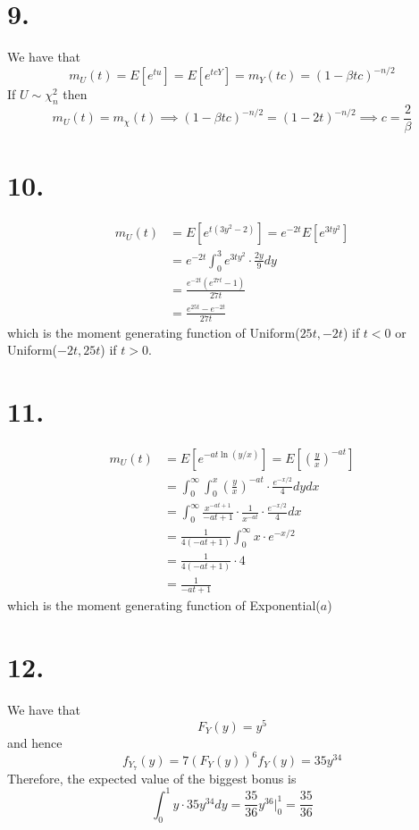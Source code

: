 \documentclass[11pt]{article}
\begin{document}
\section*{9.}
We have that
\[
    m_U(t) = E[e^{tu}] = E[e^{tcY}] = m_Y(tc) = (1-\beta tc)^{-n/2}
\]
If $U \sim \chi_n^2$ then
\[
    m_U(t) = m_\chi(t) \implies (1-\beta tc)^{-n/2} = (1-2t)^{-n/2} \implies c = \frac{2}{\beta}  
\]
\pagebreak
\section*{10.}
\begin{equation*}
    \begin{aligned}
        m_U(t) &= E[e^{t(3y^2-2)}] = e^{-2t}E[e^{3ty^2}] \\
        &= e^{-2t} \int_0^3 e^{3ty^2} \cdot \frac{2y}{9} dy \\
        &= \frac{e^{-2t} (e^{27t}-1)}{27t} \\
        &= \frac{e^{25t} - e^{-2t}}{27t}          
    \end{aligned}
\end{equation*}
which is the moment generating function of Uniform($25t, -2t$) if $t<0$ or Uniform($-2t, 25t$) if $t>0$.
\pagebreak
\section*{11.}
\begin{equation*}
    \begin{aligned}
        m_U(t) &= E[e^{-at\ln(y/x)}] = E\left[\left(\frac{y}{x}\right)^{-at}\right] \\
        &= \int_0^\infty \int_0^x \left(\frac{y}{x}\right)^{-at} \cdot \frac{e^{-x/2}}{4} dydx \\
        &= \int_0^\infty \frac{x^{-at+1}}{-at+1} \cdot \frac{1}{x^{-at}} \cdot \frac{e^{-x/2}}{4} dx \\
        &= \frac{1}{4(-at+1)}\int_0^\infty x \cdot e^{-x/2} \\
        &= \frac{1}{4(-at+1)} \cdot 4 \\
        &= \frac{1}{-at+1}
    \end{aligned}
\end{equation*} 
which is the moment generating function of Exponential($a$)
\pagebreak
\section*{12.}
We have that
\[
    F_Y(y) = y^5    
\]
and hence
\[
    f_{Y_7}(y) = 7(F_Y(y))^6 f_Y(y) = 35y^{34}
\]
Therefore, the expected value of the biggest bonus is 
\[
    \int_0^1 y \cdot 35y^{34} dy = \frac{35}{36}y^{36} |^1_0 = \frac{35}{36}  
\]
\pagebreak
\end{document}
